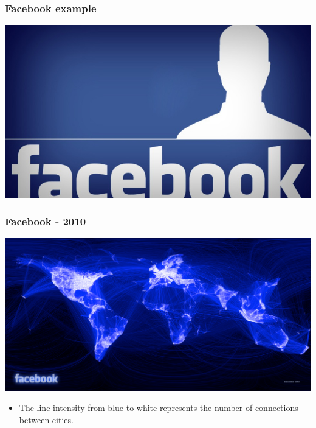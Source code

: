 \documentclass{beamer} %
\newcommand{\1}{\mathbb{1}}
\begin{document}
\begin{frame}[t]\frametitle{Facebook example}
	\begin{center}
		\includegraphics[scale = 0.3]{./visualization/facebook_logo.jpg}
	\end{center}
\end{frame}
\begin{frame}[t]\frametitle{Facebook - 2010}
	\begin{center}
		\includegraphics[scale = 0.13]{./visualization/facebook.jpg}
	\end{center}
	\begin{itemize}
		\item The line intensity from blue to white represents the number of connections between cities. 
	\end{itemize}
\end{frame}
\end{document}
